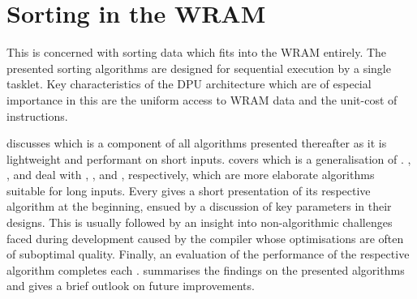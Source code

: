 \chapter[Sorting in the \texorpdfstring{\abb{WRAM}}{WRAM}]{Sorting in the \acs*{WRAM}}
\label{sec:tasklet}

This  is concerned with sorting data which fits into the \ac{WRAM} entirely.
The presented sorting algorithms are designed for sequential execution by a single tasklet.
Key characteristics of the \ac{DPU} architecture which are of especial importance in this  are the uniform access to \ac{WRAM} data and the unit-cost of instructions.

 discusses \IS{} which is a component of all algorithms presented thereafter as it is lightweight and performant on short inputs.
 covers \ShS{} which is a generalisation of \IS{}.
\hyperref[sec:tasklet:heap]{ }, , and  deal with \HS{}, \QS{}, and \MS{}, respectively, which are more elaborate algorithms suitable for long inputs.
Every  gives a short presentation of its respective algorithm at the beginning, ensued by a discussion of key parameters in their designs.
This is usually followed by an insight into non-algorithmic challenges faced during development caused by the compiler whose optimisations are often of suboptimal quality.
Finally, an evaluation of the performance of the respective algorithm completes each .
 summarises the findings on the presented algorithms and gives a brief outlook on future improvements.

